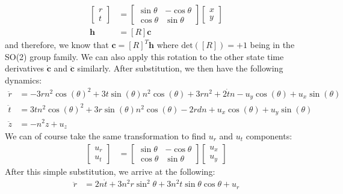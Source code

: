 \documentclass[conf]{new-aiaa}
\begin{document}
\begin{singlespace}
\begin{align}
    \begin{bmatrix}
    r \\ t
    \end{bmatrix}
    &=
    \begin{bmatrix}
    \sin{\theta} & -\cos{\theta} \\
    \cos{\theta} & \sin{\theta} 
    \end{bmatrix}
    \begin{bmatrix}
    x \\ y
    \end{bmatrix} \\
    \bm{h} &= [R] \bm{c}
\end{align}
and therefore, we know that $\bm{c} = [R]^T\bm{h}$ where $ \text{det} ([R]) = +1 $ being in the SO(2) group family. We can also apply this rotation to the other state time derivatives $\dot{\bm{c}}$ and $\ddot{\bm{c}}$ similarly. After substitution, we then have the following dynamics:
\begin{align}
    \ddot{r} &= -3rn^2{\cos\left({\theta}\right)}^2+3t\sin\left({\theta}\right)n^2\cos\left({\theta}\right)+3rn^2+2{\dot{t}}n-{u_y}\cos\left({\theta}\right)+{u_x}\sin\left({\theta}\right) \\
    \ddot{t} &= 3tn^2{\cos\left({\theta}\right)}^2+3r\sin\left({\theta}\right)n^2\cos\left({\theta}\right)-2{rd}n+{u_x}\cos\left({\theta}\right)+{u_y}\sin\left({\theta}\right) \\
    \ddot{z} &= - n^2z + u_z 
\end{align}
We can of course take the same transformation to find $u_r$ and $u_t$ components:
\begin{align}
    \begin{bmatrix}
    u_r \\ u_t
    \end{bmatrix}
    &=
    \begin{bmatrix}
    \sin{\theta} & -\cos{\theta} \\
    \cos{\theta} & \sin{\theta} 
    \end{bmatrix}
    \begin{bmatrix}
    u_x \\ u_y
    \end{bmatrix}   
\end{align}
After this simple substitution, we arrive at the following:
\begin{align}
    \ddot{r} &= 2n{\dot{t}}+3n^2r\sin^2\theta+3n^2t\sin\theta\cos\theta + u_r\\

\end{align}
\end{singlespace}
\end{document}
